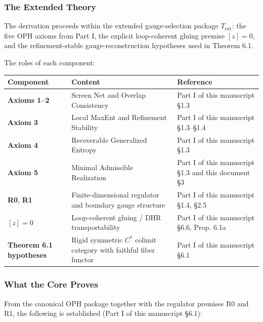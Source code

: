 \subsubsection{The Extended Theory}\label{11-the-extended-theory}

The derivation proceeds within the extended gauge-selection package \(T_{\mathrm{ext}}\): the five OPH axioms from Part I, the explicit loop-coherent gluing premise \([z]=0\), and the refinement-stable gauge-reconstruction hypotheses used in Theorem 6.1.

The roles of each component:

{\def\LTcaptype{none} %
\begin{longtable}[]{@{}>{\RaggedRight\arraybackslash}p{}>{\RaggedRight\arraybackslash}p{}>{\RaggedRight\arraybackslash}p{}@{}}
\toprule\noalign{}
Component & Content & Reference \\
\midrule\noalign{}
\endhead
\bottomrule\noalign{}
\endlastfoot
\textbf{Axioms 1--2} & Screen Net and Overlap Consistency & Part I of this manuscript \S{}1.3 \\
\textbf{Axiom 3} & Local MaxEnt and Refinement Stability & Part I of this manuscript \S{}1.3--\S{}1.4 \\
\textbf{Axiom 4} & Recoverable Generalized Entropy & Part I of this manuscript \S{}1.3 \\
\textbf{Axiom 5} & Minimal Admissible Realization & Part I of this manuscript \S{}1.3 and this document \S{}3 \\
\textbf{R0}, \textbf{R1} & Finite-dimensional regulator and boundary gauge structure & Part I of this manuscript \S{}1.4, \S{}2.5 \\
\textbf{\([z]=0\)} & Loop-coherent gluing / DHR transportability & Part I of this manuscript \S{}6.6, Prop. 6.1a \\
\textbf{Theorem 6.1 hypotheses} & Rigid symmetric \(C^*\) colimit category with faithful fiber functor & Part I of this manuscript \S{}6.1 \\
\end{longtable}
}

\subsubsection{What the Core Proves}\label{12-what-the-core-proves}

From the canonical OPH package together with the regulator premises R0 and R1, the following is established (Part I of this manuscript \S{}6.1):

